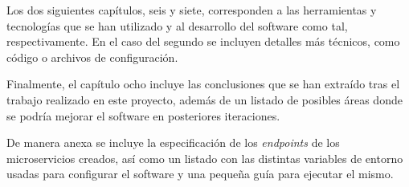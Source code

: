 Los dos siguientes capítulos, seis y siete, corresponden a las herramientas y tecnologías que se han utilizado y al desarrollo del software como tal, respectivamente. En el caso del segundo se incluyen detalles más técnicos, como código o archivos de configuración.

Finalmente, el capítulo ocho incluye las conclusiones que se han extraído tras el trabajo realizado en este proyecto, además de un listado de posibles áreas donde se podría mejorar el software en posteriores iteraciones.

De manera anexa se incluye la especificación de los \textit{endpoints} de los microservicios creados, así como un listado con las distintas variables de entorno usadas para configurar el software y una pequeña guía para ejecutar el mismo.


